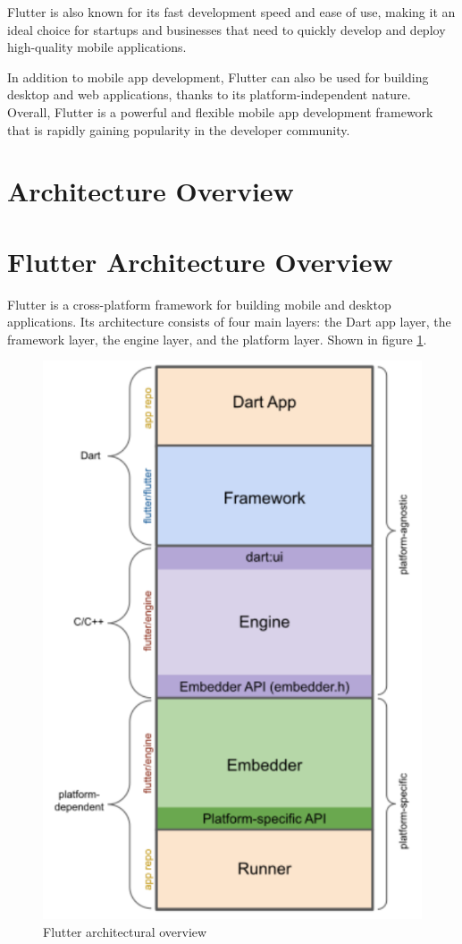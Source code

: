 \documentclass[conference]{IEEEtran}
\begin{document}
Flutter is also known for its fast development speed and ease of use, making it an ideal choice for startups and businesses that need to quickly develop and deploy high-quality mobile applications.

In addition to mobile app development, Flutter can also be used for building desktop and web applications, thanks to its platform-independent nature. Overall, Flutter is a powerful and flexible mobile app development framework that is rapidly gaining popularity in the developer community.

\section{Architecture Overview}
\section{Flutter Architecture Overview}

Flutter is a cross-platform framework for building mobile and desktop applications. Its architecture consists of four main layers: the Dart app layer, the framework layer, the engine layer, and the platform layer. Shown in figure \ref{fig:flutter_tech_stack}.

\begin{figure}[ht]
	\centerline{\includegraphics[width=\linewidth]{figures/app-anatomy}}
	\caption{Flutter architectural overview \cite{b1.1}}
	\label{fig:flutter_tech_stack}
\end{figure}
\end{document}
